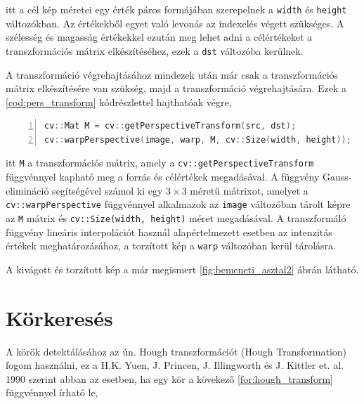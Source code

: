 \par itt a cél kép méretei egy érték páros formájában szerepelnek a \lstinline{width} és \lstinline{height} változókban. Az értékekből egyet való levonás az indexelés végett szükséges. A szélesség és magasság értékekkel ezután meg lehet adni a célértékeket a transzformációs mátrix elkészítéséhez, ezek a \lstinline{dst} változóba kerülnek.
\par A transzformáció végrehajtásához mindezek után már csak a transzformációs mátrix elkészítésére van szükség, majd a transzformáció végrehajtására.
\newline Ezek a \ref{cod:pers_transform} kódrészlettel hajthatóak végre,

\vspace{5mm}
\hspace{-10mm}
\begin{minipage}{\linewidth}
\begin{lstlisting}[language=C++, numbers=left, caption={A transzformáció végrehajtása.}, label={cod:pers_transform}]
cv::Mat M = cv::getPerspectiveTransform(src, dst);
cv::warpPerspective(image, warp, M, cv::Size(width, height));
\end{lstlisting}
\end{minipage}

\par itt \lstinline{M} a transzformációs mátrix, amely a \lstinline{cv::getPerspectiveTransform} függvénnyel \cite{opencv_docs} kapható meg a forrás és célértékek megadásával. A függvény Gauss-elimináció \cite{grcar2011mathematicians} segítségével számol ki egy $3\times3$ méretű mátrixot, amelyet a \lstinline{cv::warpPerspective} függvénnyel \cite{opencv_docs} alkalmazok az \lstinline{image} változóban tárolt képre az \lstinline{M} mátrix és \lstinline{cv::Size(width, height)} méret megadásával. A transzformáló függvény lineáris interpolációt \cite{blu0401interpolation} használ alapértelmezett esetben az intenzitás értékek meghatározásához, a torzított kép a \lstinline{warp} változóban kerül tárolásra.
\par A kivágott és torzított kép a már megismert \ref{fig:bemeneti_asztal2} ábrán látható.

\section{Körkeresés}
A körök detektálásához az ún. Hough transzformációt (Hough Transformation) fogom használni, ez a H.K. Yuen, J. Princen, J. Illingworth és J. Kittler et. al. 1990 \cite{YUEN199071} szerint abban az esetben, ha egy kör a kövekező \ref{for:hough_transform} függvénnyel írható le,

